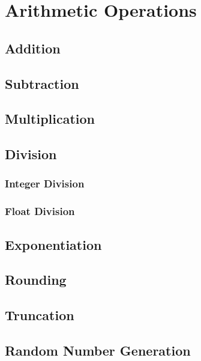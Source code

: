 \chapter{Arithmetic Operations}
	\section{Addition}
	
	\section{Subtraction}
	
	\section{Multiplication}
	
	\section{Division}
		
		\subsection{Integer Division}
			
		\subsection{Float Division}
		
	\section{Exponentiation}
		
	\section{Rounding}
	
	\section{Truncation}
	
	\section{Random Number Generation}
		